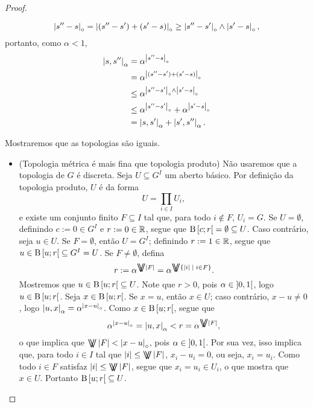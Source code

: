 \begin{proof}
\begin{itemize}
			\begin{equation*}
			\left\vert{s''-s}\right\vert_{\circ} = \left\vert{(s''-s') + (s'-s)}\right\vert_{\circ} \geq \left\vert{s''-s'}\right\vert_{\circ} \mathbin{\wedge} \left\vert{s'-s}\right\vert_{\circ},
			\end{equation*}
		portanto, como $\alpha<1$,
			\begin{align*}
			\left\vert{s},{s''}\right\vert_\alpha &= \alpha^{\left\vert{s''-s}\right\vert_{\circ}} \\
				&= \alpha^{\left\vert{(s''-s') + (s'-s)}\right\vert_{\circ}} \\
				&\leq \alpha^{\left\vert{s''-s'}\right\vert_{\circ} \mathbin{\wedge} \left\vert{s'-s}\right\vert_{\circ}} \\
				&\leq \alpha^{\left\vert{s''-s'}\right\vert_{\circ}} + \alpha^{\left\vert{s'-s}\right\vert_{\circ}} \\
				&= \left\vert{s},{s'}\right\vert_\alpha + \left\vert{s'},{s''}\right\vert_\alpha.
			\end{align*}
	\end{itemize}

	Mostraremos que as topologias são iguais.

	\begin{itemize}
	\item (Topologia métrica é mais fina que topologia produto) Não usaremos que a topologia de $G$ é discreta. Seja $U \subseteq G^{I}$ um aberto básico. Por definição da topologia produto, $U$ é da forma
	\begin{equation*}
	U = \prod_{i \in I} U_i,
	\end{equation*}
	e existe um conjunto finito $F \subseteq I$ tal que, para todo $i \notin F$, $U_i = G$. Se $U = \emptyset$, %
	definindo $c := 0 \in G^{I}$ e $r := 0 \in \mathbb{R}$, segue que $\mathrm{B}\left[{c};{r}\right[ = \emptyset \subseteq U$. Caso contrário, seja $u \in U$. Se $F = \emptyset$, então $U = G^{I}$; definindo $r:=1 \in \mathbb{R}$, segue que $u \in \mathrm{B}\left[{u};{r}\right[ \subseteq G^{I} = U$. Se $F \neq \emptyset$, defina
		\begin{equation*}
		r := \alpha^{\max\abs{F}} = \alpha^{\max\set{\abs{i}}{i \in F}}.
		\end{equation*}
	Mostremos que $u \in \mathrm{B}\left[{u};{r}\right[ \subseteq U$. Note que $r>0$, pois $\alpha \in \left]{0},{1}\right[$, logo $u \in \mathrm{B}\left[{u};{r}\right[$. Seja $x \in \mathrm{B}\left[{u};{r}\right[$. Se $x=u$, então $x \in U$; caso contrário, $x-u \neq 0$, logo $\left\vert{u},{x}\right\vert_\alpha = \alpha^{\left\vert{x-u}\right\vert_{\circ}}$. %
	Como $x \in \mathrm{B}\left[{u};{r}\right[$, segue que
		\begin{equation*}
		\alpha^{\ords{x-u}} = \dist{u}{x}_\alpha< r = \alpha^{\max\abs{F}},
		\end{equation*}
	o que implica que $\max\abs{F} < \ords{x-u}$, pois $\alpha \in \left]{0},{1}\right[$. Por sua vez, isso implica que, para todo $i \in I$ tal que $\abs{i} \leq \max\abs{F}$, $x_i - u_i = 0$, ou seja, $x_i = u_i$. Como todo $i \in F$ satisfaz $\abs{i} \leq \max\abs{F}$, segue que $x_i = u_i \in U_i$, o que mostra que $x \in U$. Portanto $\mathrm{B}\left[{u};{r}\right[ \subseteq U$.


\end{itemize}
\end{proof}

